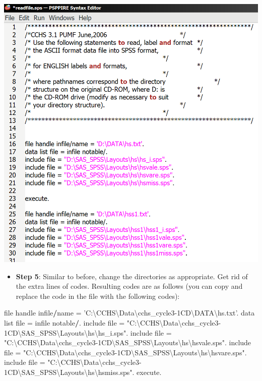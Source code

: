 \documentclass[
]{book}
\newenvironment{Shaded}{\begin{snugshade}}{\end{snugshade}}
\newcommand{\NormalTok}[1]{#1}
\newcommand{\OperatorTok}[1]{\textcolor[rgb]{0.81,0.36,0.00}{\textbf{#1}}}
\newcommand{\StringTok}[1]{\textcolor[rgb]{0.31,0.60,0.02}{#1}}
\providecommand{\tightlist}{%
  \setlength{\itemsep}{0pt}\setlength{\parskip}{0pt}}
\begin{document}
\includegraphics[width=0.65\linewidth]{images/abacusX33}

\begin{itemize}
\tightlist
\item
  \textbf{Step 5}: Similar to before, change the directories as appropriate. Get rid of the extra lines of codes. Resulting codes are as follows (you can copy and replace the code in the file with the following codes):
\end{itemize}

\begin{Shaded}
\begin{Highlighting}[]
\NormalTok{file handle infile}\OperatorTok{/}\NormalTok{name =}\StringTok{ 'C:\textbackslash{}CCHS\textbackslash{}Data\textbackslash{}cchs_cycle3-1CD\textbackslash{}DATA\textbackslash{}hs.txt'}\NormalTok{.}
\NormalTok{data list file =}\StringTok{ }\NormalTok{infile notable}\OperatorTok{/}\NormalTok{.}
\NormalTok{include file =}\StringTok{ "C:\textbackslash{}CCHS\textbackslash{}Data\textbackslash{}cchs_cycle3-1CD\textbackslash{}SAS_SPSS\textbackslash{}Layouts\textbackslash{}hs\textbackslash{}hs_i.sps"}\NormalTok{.}
\NormalTok{include file =}\StringTok{ "C:\textbackslash{}CCHS\textbackslash{}Data\textbackslash{}cchs_cycle3-1CD\textbackslash{}SAS_SPSS\textbackslash{}Layouts\textbackslash{}hs\textbackslash{}hsvale.sps"}\NormalTok{.}
\NormalTok{include file =}\StringTok{ "C:\textbackslash{}CCHS\textbackslash{}Data\textbackslash{}cchs_cycle3-1CD\textbackslash{}SAS_SPSS\textbackslash{}Layouts\textbackslash{}hs\textbackslash{}hsvare.sps"}\NormalTok{.}
\NormalTok{include file =}\StringTok{ "C:\textbackslash{}CCHS\textbackslash{}Data\textbackslash{}cchs_cycle3-1CD\textbackslash{}SAS_SPSS\textbackslash{}Layouts\textbackslash{}hs\textbackslash{}hsmiss.sps"}\NormalTok{.}
\NormalTok{execute.}
\end{Highlighting}
\end{Shaded}
\end{document}
